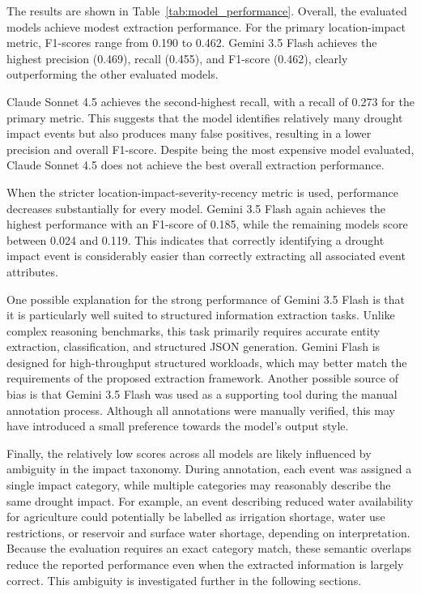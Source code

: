 

The results are shown in Table~\ref{tab:model_performance}. Overall, the evaluated models achieve modest extraction performance. For the primary location-impact metric, F1-scores range from 0.190 to 0.462. Gemini 3.5 Flash achieves the highest precision (0.469), recall (0.455), and F1-score (0.462), clearly outperforming the other evaluated models.

Claude Sonnet 4.5 achieves the second-highest recall, with a recall of 0.273 for the primary metric. This suggests that the model identifies relatively many drought impact events but also produces many false positives, resulting in a lower precision and overall F1-score. Despite being the most expensive model evaluated, Claude Sonnet 4.5 does not achieve the best overall extraction performance.

When the stricter location-impact-severity-recency metric is used, performance decreases substantially for every model. Gemini 3.5 Flash again achieves the highest performance with an F1-score of 0.185, while the remaining models score between 0.024 and 0.119. This indicates that correctly identifying a drought impact event is considerably easier than correctly extracting all associated event attributes.

One possible explanation for the strong performance of Gemini 3.5 Flash is that it is particularly well suited to structured information extraction tasks. Unlike complex reasoning benchmarks, this task primarily requires accurate entity extraction, classification, and structured JSON generation. Gemini Flash is designed for high-throughput structured workloads, which may better match the requirements of the proposed extraction framework. Another possible source of bias is that Gemini 3.5 Flash was used as a supporting tool during the manual annotation process. Although all annotations were manually verified, this may have introduced a small preference towards the model's output style.

Finally, the relatively low scores across all models are likely influenced by ambiguity in the impact taxonomy. During annotation, each event was assigned a single impact category, while multiple categories may reasonably describe the same drought impact. For example, an event describing reduced water availability for agriculture could potentially be labelled as irrigation shortage, water use restrictions, or reservoir and surface water shortage, depending on interpretation. Because the evaluation requires an exact category match, these semantic overlaps reduce the reported performance even when the extracted information is largely correct. This ambiguity is investigated further in the following sections.

